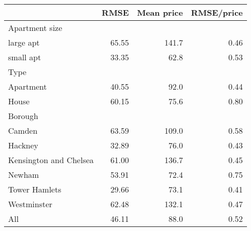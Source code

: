 
\begin{tabular}{lrrr}
\toprule
 & RMSE & Mean price & RMSE/price\\
\midrule
Apartment size &  &  & \\
large apt & 65.55 & 141.7 & 0.46\\
small apt & 33.35 & 62.8 & 0.53\\
Type &  &  & \\
Apartment & 40.55 & 92.0 & 0.44\\
House & 60.15 & 75.6 & 0.80\\
Borough &  &  & \\
Camden & 63.59 & 109.0 & 0.58\\
Hackney & 32.89 & 76.0 & 0.43\\
Kensington and Chelsea & 61.00 & 136.7 & 0.45\\
Newham & 53.91 & 72.4 & 0.75\\
Tower Hamlets & 29.66 & 73.1 & 0.41\\
Westminster & 62.48 & 132.1 & 0.47\\
All & 46.11 & 88.0 & 0.52\\
\bottomrule
\end{tabular}